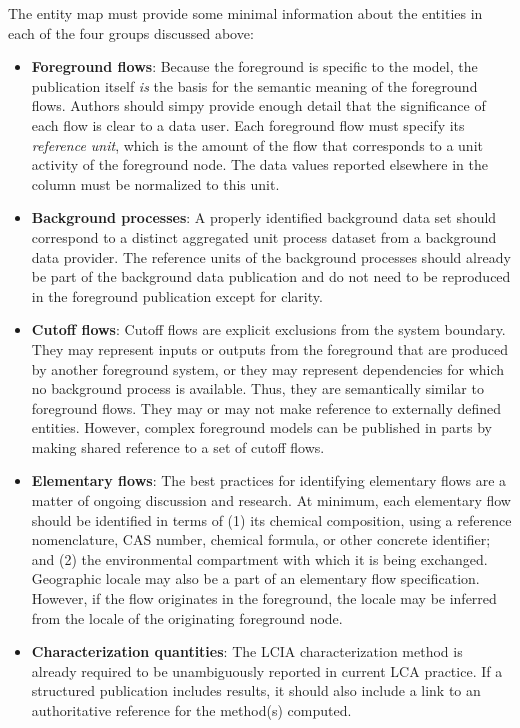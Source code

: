 The entity map must provide some minimal information about the entities in each of the four groups discussed above:
\begin{itemize}
\item \textbf{Foreground flows}: Because the foreground is specific to the model, the publication itself \emph{is} the basis for the semantic meaning of the foreground flows. Authors should simpy provide enough detail that the significance of each flow is clear to a data user.  Each foreground flow must specify its \emph{reference unit}, which is the amount of the flow that corresponds to a unit activity of the foreground node.  The data values reported elsewhere in the column must be normalized to this unit.
\item \textbf{Background processes}: A properly identified background data set should correspond to a distinct aggregated unit process dataset from a background data provider.  The reference units of the background processes should already be part of the background data publication and do not need to be reproduced in the foreground publication except for clarity.  
\item \textbf{Cutoff flows}: Cutoff flows are explicit exclusions from the system boundary.  They may represent inputs or outputs from the foreground that are produced by another foreground system, or they may represent dependencies for which no background process is available.  Thus, they are semantically similar to foreground flows. They may or may not make reference to externally defined entities.  However, complex foreground models can be published in parts by making shared reference to a set of cutoff flows.
\item \textbf{Elementary flows}: The best practices for identifying elementary flows are a matter of ongoing discussion and research.  At minimum, each elementary flow should be identified in terms of (1) its chemical composition, using a reference nomenclature, CAS number, chemical formula, or other concrete identifier; and (2) the environmental compartment with which it is being exchanged.  Geographic locale may also be a part of an elementary flow specification.  However, if the flow originates in the foreground, the locale may be inferred from the locale of the originating foreground node.
  \item \textbf{Characterization quantities}: The LCIA characterization method is already required to be unambiguously reported in current LCA practice.  If a structured publication includes results, it should also include a link to an authoritative reference for the method(s) computed.  
\end{itemize}


